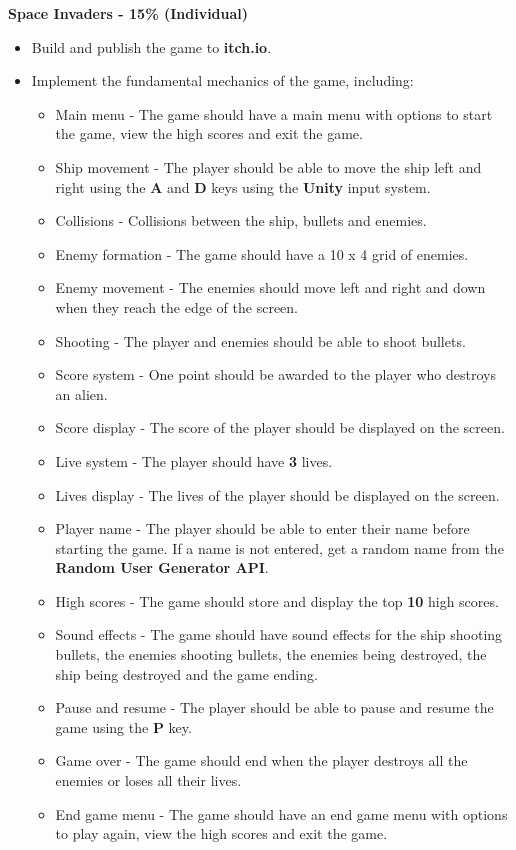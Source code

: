 \documentclass{article}
\begin{document}
\textbf{Space Invaders - 15\% (Individual)}
\begin{itemize}
    \item Build and publish the game to \textbf{itch.io}.
    \item Implement the fundamental mechanics of the game, including:
    \begin{itemize}
        \item Main menu - The game should have a main menu with options to start the game, view the high scores and exit the game.
        \item Ship movement - The player should be able to move the ship left and right using the \textbf{A} and \textbf{D} keys using the \textbf{Unity} input system.
        \item Collisions - Collisions between the ship, bullets and enemies.
        \item Enemy formation - The game should have a 10 x 4 grid of enemies.
        \item Enemy movement - The enemies should move left and right and down when they reach the edge of the screen.
        \item Shooting - The player and enemies should be able to shoot bullets.
        \item Score system - One point should be awarded to the player who destroys an alien.
        \item Score display - The score of the player should be displayed on the screen.
        \item Live system - The player should have \textbf{3} lives.
        \item Lives display - The lives of the player should be displayed on the screen.
        \item Player name - The player should be able to enter their name before starting the game. If a name is not entered, get a random name from the \textbf{Random User Generator API}.
        \item High scores - The game should store and display the top \textbf{10} high scores.
        \item Sound effects - The game should have sound effects for the ship shooting bullets, the enemies shooting bullets, the enemies being destroyed, the ship being destroyed and the game ending.
        \item Pause and resume - The player should be able to pause and resume the game using the \textbf{P} key.
        \item Game over - The game should end when the player destroys all the enemies or loses all their lives.
        \item End game menu - The game should have an end game menu with options to play again, view the high scores and exit the game.
    \end{itemize}
	

\end{itemize}
\end{document}
